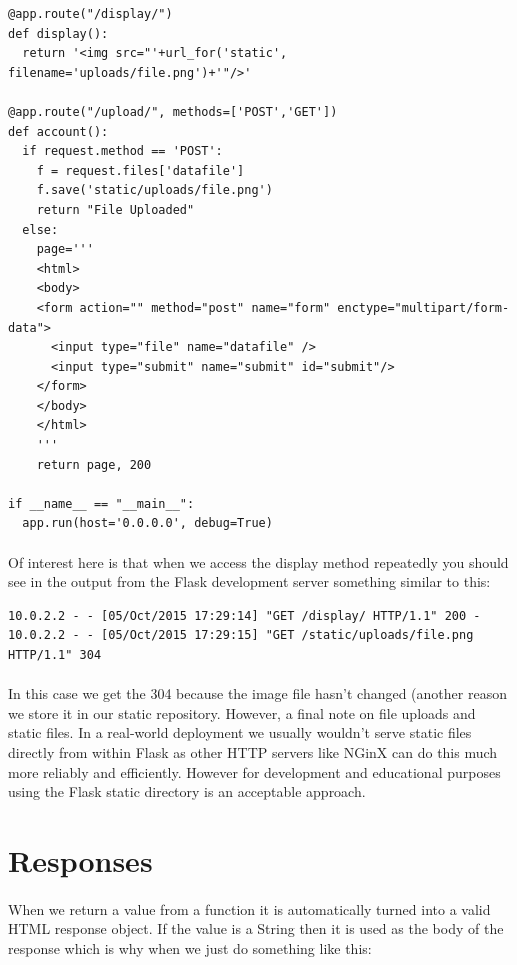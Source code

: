 \documentclass[12pt, a4paper, oneside]{book}
\begin{document}
{\begin{lstlisting}
@app.route("/display/")
def display():
  return '<img src="'+url_for('static', filename='uploads/file.png')+'"/>'

@app.route("/upload/", methods=['POST','GET'])
def account():
  if request.method == 'POST':
    f = request.files['datafile']
    f.save('static/uploads/file.png')
    return "File Uploaded"
  else:
    page='''
    <html>
    <body>
    <form action="" method="post" name="form" enctype="multipart/form-data">
      <input type="file" name="datafile" />
      <input type="submit" name="submit" id="submit"/>
    </form>
    </body>
    </html>
    '''
    return page, 200

if __name__ == "__main__":
  app.run(host='0.0.0.0', debug=True)
\end{lstlisting}

\paragraph{} Of interest here is that when we access the display method repeatedly you should see in the output from the Flask development server something similar to this:

\begin{lstlisting}[style=DOS]
10.0.2.2 - - [05/Oct/2015 17:29:14] "GET /display/ HTTP/1.1" 200 -
10.0.2.2 - - [05/Oct/2015 17:29:15] "GET /static/uploads/file.png HTTP/1.1" 304
\end{lstlisting}

\paragraph{} In this case we get the 304 because the image file hasn't changed (another reason we store it in our static repository. However, a final note on file uploads and static files. In a real-world deployment we usually wouldn't serve static files directly from within Flask as other HTTP servers like NGinX can do this much more reliably and efficiently. However for development and educational purposes using the Flask static directory is an acceptable approach.


\section{Responses}
\label{responses}
\paragraph{} When we return a value from a function it is automatically turned into a valid HTML response object. If the value is a String then it is used as the body of the response which is why when we just do something like this:

}
\end{document}
